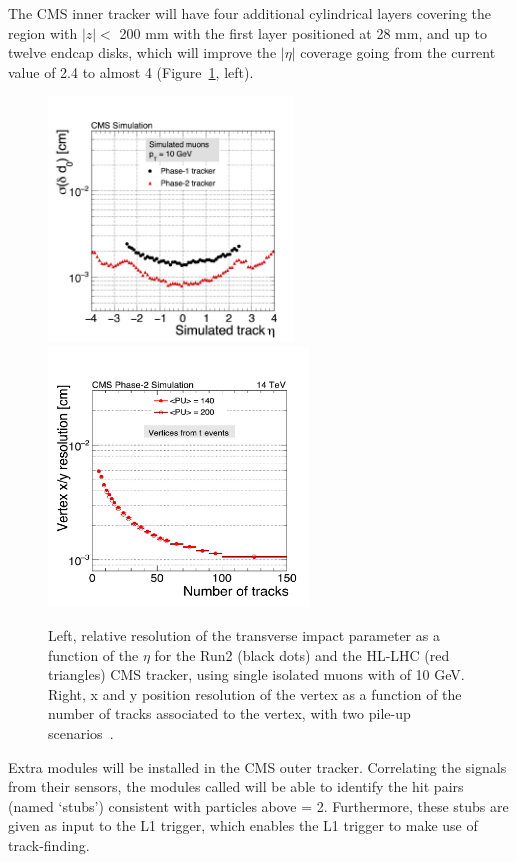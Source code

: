 The CMS inner tracker will have four additional cylindrical 
layers covering the region with $|z| < $ 200 mm with the first layer positioned at
28 mm, and up to twelve endcap
disks, which will improve the $|\eta|$ coverage going from the current
value of 2.4 to almost 4 (Figure~\ref{fig:MDT_alimena}, left).
\begin{figure}[h!]
\centering
    \includegraphics[clip,trim=0.5cm 0cm 0.cm 1.8cm, height =6.5cm]{Figures/c7/IPrel.pdf}
    \includegraphics[clip,trim=0.5cm 0cm 0.cm 1.3cm, height = 6.9cm]{Figures/c7/vertexrel.pdf}
\caption{Left, relative resolution of the transverse impact
parameter as a function of the $\eta$ for the Run2 (black dots) and the
HL-LHC (red triangles) CMS tracker, using single isolated muons with
\pt of 10 GeV. Right, x and y position resolution of the vertex as a function of the
number of tracks associated to the vertex, with two pile-up scenarios~\cite{Alimena_2020}.}
\label{fig:MDT_alimena}
\end{figure}

Extra modules will be installed in
the CMS outer tracker. Correlating the signals from their sensors, the modules called \pt will be able to identify
the hit pairs (named ‘stubs’) consistent with particles above \pt =
2\GeV. Furthermore, these stubs are given as input to the L1 trigger, which enables the L1 trigger to make use of track-finding.

